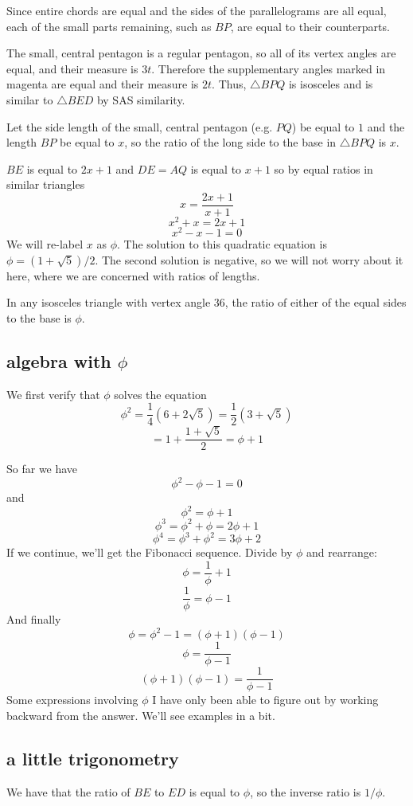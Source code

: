 \documentclass[11pt, oneside]{article}
\begin{document}
Since entire chords are equal and the sides of the parallelograms are all equal, each of the small parts remaining, such as $BP$, are equal to their counterparts.

The small, central pentagon is a regular pentagon, so all of its vertex angles are equal, and their measure is $3t$.  Therefore the supplementary angles marked in magenta are equal and their measure is $2t$.  Thus, $\triangle BPQ$ is isosceles and is similar to $\triangle BED$ by SAS similarity.

Let the side length of the small, central pentagon (e.g. $PQ$) be equal to $1$ and the length $BP$ be equal to $x$, so the ratio of the long side to the base in $\triangle BPQ$ is $x$.  

$BE$ is equal to $2x + 1$ and $DE = AQ$ is equal to $x + 1$ so by equal ratios in similar triangles
\[ x = \frac{2x + 1}{x + 1} \]
\[ x^2 + x = 2x + 1 \]
\[ x^2 - x - 1 = 0 \]
We will re-label $x$ as $\phi$.  The solution to this quadratic equation is $\phi = (1 + \sqrt{5})/2$.  The second solution is negative, so we will not worry about it here, where we are concerned with ratios of lengths.

In any isosceles triangle with vertex angle $36$, the ratio of either of the equal sides to the base is $\phi$.

\subsection*{algebra with $\phi$}

We first verify that $\phi$ solves the equation
\[ \phi^2 = \frac{1}{4}(6 + 2 \sqrt{5}) = \frac{1}{2}(3 + \sqrt{5}) \]
\[ = 1 + \frac{1 + \sqrt{5}}{2} = \phi + 1 \]

So far we have
\[ \phi^2 - \phi - 1 = 0 \]
and
\[ \phi^2 = \phi  + 1 \]
\[ \phi^3 = \phi^2 + \phi  = 2 \phi + 1 \]
\[ \phi^4 = \phi^3 + \phi^2  = 3 \phi + 2 \]
If we continue, we'll get the Fibonacci sequence.  Divide by $\phi$ and rearrange:
\[ \phi = \frac{1}{\phi} + 1 \]
\[ \frac{1}{\phi} = \phi - 1 \]
And finally
\[ \phi = \phi^2 - 1 = (\phi + 1)(\phi - 1) \]
\[ \phi = \frac{1}{\phi - 1} \]
\[ (\phi + 1)(\phi - 1)  = \frac{1}{\phi - 1} \]
Some expressions involving $\phi$ I have only been able to figure out by working backward from the answer.  We'll see examples in a bit.

\subsection*{a little trigonometry}
We have that the ratio of $BE$ to $ED$ is equal to $\phi$, so the inverse ratio is $1/\phi$.  
\end{document}

